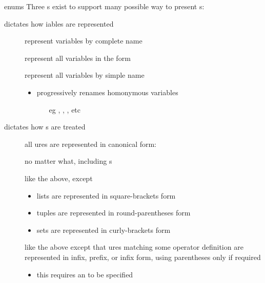 \documentclass[handout]{beamer}
\begin{document}
\begin{frame}[allowframebreaks]{ enums}
    Three s exist to support many possible way to present s:

    \begin{block}{ dictates how iables are represented}
        \begin{description}
            \item[] represent variables by \alert{complete} name
            \item[] represent all variables in the form 
            \item[] represent all variables by \alert{simple} name
            \begin{itemize}\small
                \item progressively renames homonymous variables
                \begin{itemize}\scriptsize
                    \item[eg] , , , etc
                \end{itemize}
            \end{itemize}
        \end{description}
    \end{block}

    \begin{block}{ dictates how s are treated}
        \begin{description}
            \item[] all ures are represented in canonical form:
            \begin{center}
            \end{center}
            no matter what, including s
            \item[] like the above, except
            \begin{itemize}
                \item lists are represented in square-brackets form
                \item tuples are represented in round-parentheses form
                \item sets are represented in curly-brackets form
            \end{itemize}
            \item[] like the above except that ures matching some operator definition are represented in infix, prefix, or infix form, using parentheses only if required
            \begin{itemize}\small
                \item this requires an  to be specified
            \end{itemize}
        \end{description}
    \end{block}


\end{frame}
\end{document}
